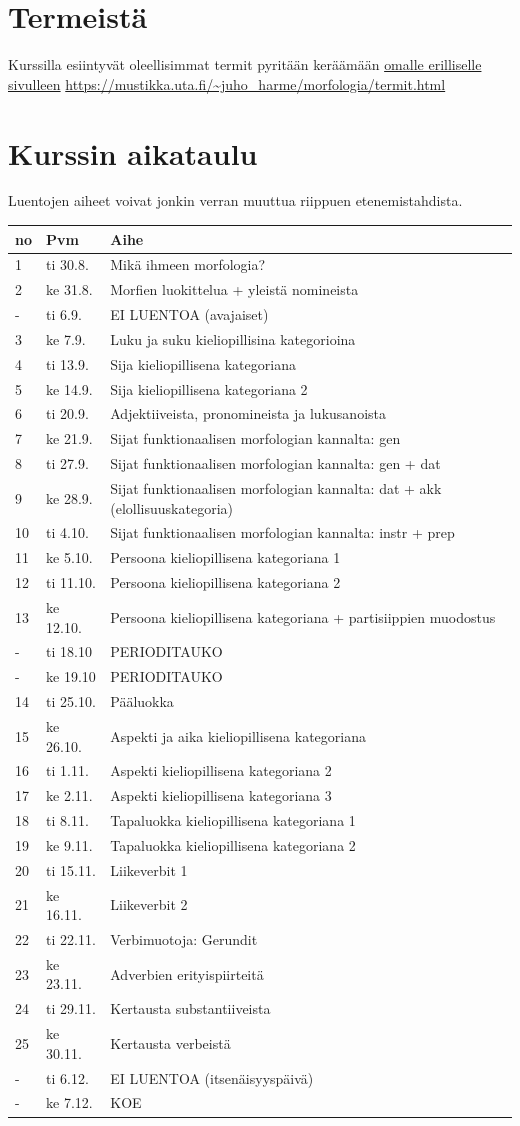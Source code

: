 \documentclass[]{scrartcl}
\begin{document}
\section{Termeistä}\label{termeistuxe4}

Kurssilla esiintyvät oleellisimmat termit pyritään keräämään
\href{termit.html}{omalle erilliselle sivulleen}
\url{https://mustikka.uta.fi/~juho_harme/morfologia/termit.html}

\section{Kurssin aikataulu}\label{kurssin-aikataulu}

Luentojen aiheet voivat jonkin verran muuttua riippuen etenemistahdista.

\begin{longtable}[c]{@{}lll@{}}
\toprule
no & Pvm & Aihe\tabularnewline
\midrule
\endhead
1 & ti 30.8. & Mikä ihmeen morfologia?\tabularnewline
2 & ke 31.8. & Morfien luokittelua + yleistä nomineista\tabularnewline
- & ti 6.9. & EI LUENTOA (avajaiset)\tabularnewline
3 & ke 7.9. & Luku ja suku kieliopillisina kategorioina\tabularnewline
4 & ti 13.9. & Sija kieliopillisena kategoriana\tabularnewline
5 & ke 14.9. & Sija kieliopillisena kategoriana 2\tabularnewline
6 & ti 20.9. & Adjektiiveista, pronomineista ja
lukusanoista\tabularnewline
7 & ke 21.9. & Sijat funktionaalisen morfologian kannalta:
gen\tabularnewline
8 & ti 27.9. & Sijat funktionaalisen morfologian kannalta: gen +
dat\tabularnewline
9 & ke 28.9. & Sijat funktionaalisen morfologian kannalta: dat + akk
(elollisuuskategoria)\tabularnewline
10 & ti 4.10. & Sijat funktionaalisen morfologian kannalta: instr +
prep\tabularnewline
11 & ke 5.10. & Persoona kieliopillisena kategoriana 1\tabularnewline
12 & ti 11.10. & Persoona kieliopillisena kategoriana 2\tabularnewline
13 & ke 12.10. & Persoona kieliopillisena kategoriana + partisiippien
muodostus\tabularnewline
- & ti 18.10 & PERIODITAUKO\tabularnewline
- & ke 19.10 & PERIODITAUKO\tabularnewline
14 & ti 25.10. & Pääluokka\tabularnewline
15 & ke 26.10. & Aspekti ja aika kieliopillisena
kategoriana\tabularnewline
16 & ti 1.11. & Aspekti kieliopillisena kategoriana 2\tabularnewline
17 & ke 2.11. & Aspekti kieliopillisena kategoriana 3\tabularnewline
18 & ti 8.11. & Tapaluokka kieliopillisena kategoriana 1\tabularnewline
19 & ke 9.11. & Tapaluokka kieliopillisena kategoriana 2\tabularnewline
20 & ti 15.11. & Liikeverbit 1\tabularnewline
21 & ke 16.11. & Liikeverbit 2\tabularnewline
22 & ti 22.11. & Verbimuotoja: Gerundit\tabularnewline
23 & ke 23.11. & Adverbien erityispiirteitä\tabularnewline
24 & ti 29.11. & Kertausta substantiiveista\tabularnewline
25 & ke 30.11. & Kertausta verbeistä\tabularnewline
- & ti 6.12. & EI LUENTOA (itsenäisyyspäivä)\tabularnewline
- & ke 7.12. & KOE\tabularnewline
\bottomrule
\end{longtable}
\end{document}
